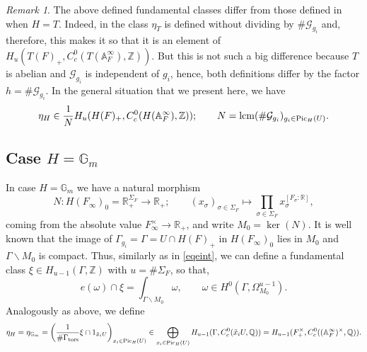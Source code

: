 \documentclass{amsart}
\theoremstyle{definition}
\theoremstyle{remark}
\newtheorem{remark}[theorem]{Remark}
\numberwithin{equation}{section}
\newcommand{\Z}{{\mathbb Z}}
\newcommand{\A}{{\mathbb A}}
\newcommand{\Q}{{\mathbb Q}}
\newcommand{\R}{{\mathbb R}}
\newcommand{\G}{{\mathbb G}}
\newcommand{\cG}{{\mathcal G}}
\begin{document}
\begin{remark}\label{remarkonHC}
    The above defined fundamental classes differ from those defined in \cite{preprintsanti2} when $H=T$.
    Indeed, in \cite{preprintsanti2} the class $\eta_T$ is defined without dividing by $\#\cG_{g_i}$ and, therefore, this makes it so that it is an element of $H_u(T(F)_+,C_c^0(T(\A_F^\infty),\Z))$. But this is not such a big difference because $T$ is abelian and $\cG_{g_i}$ is independent of $g_i$, hence, both definitions differ by the factor $h=\#\cG_{g_i}$. In the general situation that we present here, we have
    \[
    \eta_H\in \frac{1}{N}H_u(H(F)_+,C_c^0(H(\A_F^\infty),\Z));\qquad N={\rm lcm}(\#\cG_{g_i})_{g_i\in {\rm Pic}_H(U)}.
    \]
\end{remark}



\subsection{Case $H=\G_m$}\label{fundclassGm} 
In case $H=\G_m$ we have a natural morphism 
\begin{equation}\label{absvalueGm}
    N:H(F_\infty)_0=\R_+^{\Sigma_F}\rightarrow\R_+;\qquad (x_\sigma)_{\sigma\in \Sigma_F}\longmapsto\prod_{\sigma\in\Sigma_F}x_\sigma^{[F_\sigma:\R]},
\end{equation}
coming from the absolute value $F_\infty^\times\rightarrow\R_+$, and write $M_0=\ker(N)$. It is well known that the image of $\Gamma_{g_i}=\Gamma=U\cap H(F)_+$ in $H(F_\infty)_0$ lies in $M_0$ and $\Gamma\backslash M_0$ is compact. Thus, similarly as in \eqref{eqeint}, we can define a fundamental class $\xi\in H_{u-1}(\Gamma,\Z)$ with $u=\#\Sigma_F$, so that,
\begin{equation}\label{eqeint2}
e(\omega)\cap \xi=\int_{\Gamma\backslash M_0} \omega,\qquad \omega\in H^0(\Gamma,\Omega_{M_0}^{u-1}).
\end{equation}
Analogously as above, we define
\[
\eta_H=\eta_{\G_m}=\left(\frac{1}{\#\Gamma_{\rm tors}}\xi\cap 1_{\tilde x_i U}\right)_{x_i\in {\rm Pic}_H(U)}\in \bigoplus_{x_i \in {\rm Pic}_H(U)} H_{u-1}(\Gamma,C_c^0(\tilde x_iU,\Q))=H_{u-1}(F_+^\times,C_c^0((\A_F^\infty)^\times,\Q)).
\]
\end{document}
